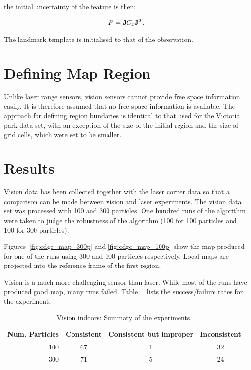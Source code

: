 the initial uncertainty of the feature is then:

$$
P = {\bf J} C_z {\bf J}^T.
$$

The landmark template is initialised to that of the observation.

\section{Defining Map Region}

Unlike laser range sensors, vision sensors cannot provide free space
information easily. It is therefore assumed that no free space
information is available. The approach for defining region bundaries
is identical to that used for the Victoria park data set, with an
exception of the size of the initial region and the size of grid
cells, which were set to be smaller.

\section{Results}

Vision data has been collected together with the laser corner data so
that a comparison can be made between vision and laser
experiments. The vision data set was processed with 100 and 300
particles. One hundred runs of the algorithm were taken to judge the
robustness of the algorithm (100 for 100 particles and 100 for 300
particles).

Figures~\ref{fig:edge_map_300p} and \ref{fig:edge_map_100p} show the
map produced for one of the runs using 300 and 100 particles
respectively. Local maps are projected into the reference frame of the
first region. 

Vision is a much more challenging sensor than laser. While most of the
runs have produced good map, many runs
failed. Table~\ref{tab:results_vision} lists the success/failure rates
for the experiment.

\begin{table}[ht]
\center
\begin{tabular}{r|c|c|c}
Num. Particles & Consistent & Consistent but improper & Inconsistent\\
\hline
100 & 67 & 1 & 32\\
300 & 71 & 5 & 24\\
\end{tabular}
\caption{Vision indoors: Summary of the experiments.}
\label{tab:results_vision}
\end{table}

